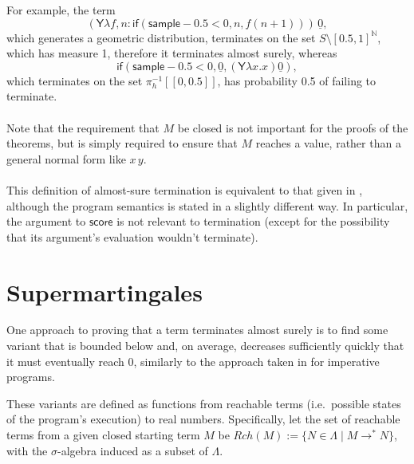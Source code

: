 \documentclass{article}
\newcommand{\tY}{\mathsf{Y}}
\newcommand{\tif}[3]{\mathsf{if}(#1, #2, #3)} %
\newcommand{\tsample}{\mathsf{sample}}
\newcommand{\tscore}{\mathsf{score}}
\theoremstyle{definition}
\theoremstyle{lemma}
\theoremstyle{remark}
\begin{document}
For example, the term 
\[
(\tY \lambda f, n: \tif{\tsample - 0.5 < 0}{n}{f (n+1)} ) \, \underline{0},
\] 
which generates a geometric distribution, terminates on the set $S \setminus [0.5,1]^\mathbb N$, which has measure 1, therefore it terminates almost surely, whereas 
\[
\tif{\tsample - 0.5 < 0}{\underline 0}{(\tY \lambda x. x) \underline 0},
\] 
which terminates on the set $\pi_h^{-1}[[0,0.5]]$, has probability 0.5 of failing to terminate.

\paragraph{}
Note that the requirement that $M$ be closed is not important for the proofs of the theorems, but is simply required to ensure that $M$ reaches a value, rather than a general normal form like $x \, y$.

\paragraph{}
This definition of almost-sure termination is equivalent to that given in \citep{MakOP20b}, although the program semantics is stated in a slightly different way. In particular, the argument to $\tscore$ is not relevant to termination (except for the possibility that its argument's evaluation wouldn't terminate).

\iffalse
\lo{Your operational semantics does not maintain a record of the current weight of the reduction.
A.s.~termination does depend on $\tscore$: see \cite[\S 4.3]{DBLP:journals/corr/abs-2004-03924}\footnote{\url{https://arxiv.org/abs/2004.03924}}.
I think it important to take the behaviour of $\tscore$ into account;
you should do it as a future task.}
\fi

\section{Supermartingales}
One approach to proving that a term terminates almost surely is to find some variant that is bounded below and, on average, decreases sufficiently quickly that it must eventually reach 0, similarly to the approach taken in \citep{DBLP:journals/pacmpl/McIverMKK18} for imperative programs.

These variants are defined as functions from reachable terms (i.e.~possible states of the program's execution) to real numbers. Specifically, let the set of reachable terms from a given closed starting term $M$ be $Rch(M) := \{N \in \Lambda \mid M \to^* N \}$, with the $\sigma$-algebra induced as a subset of $\Lambda$.
\end{document}
